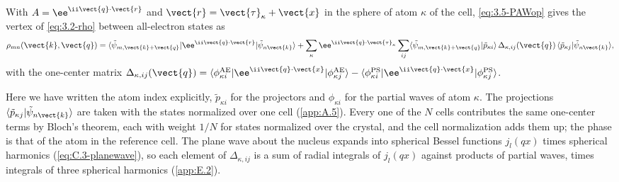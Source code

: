 \begin{keyresult}
With $A = \ee^{\ii\vect{q}\cdot\vect{r}}$ and $\vect{r} = \vect{\tau}_\kappa + \vect{x}$ in the sphere of atom $\kappa$ of the cell, \cref{eq:3.5-PAWop} gives the vertex of \cref{eq:3.2-rho} between all-electron states as
\begin{equation}
  \rho_{mn}(\vect{k}, \vect{q}) = \langle\tilde\psi_{m,\vect{k}+\vect{q}}|\ee^{\ii\vect{q}\cdot\vect{r}}|\tilde\psi_{n\vect{k}}\rangle
  + \sum_\kappa\ee^{\ii\vect{q}\cdot\vect{\tau}_\kappa}\sum_{ij}\langle\tilde\psi_{m,\vect{k}+\vect{q}}|\tilde p_{\kappa i}\rangle\,\Delta_{\kappa,ij}(\vect{q})\,\langle\tilde p_{\kappa j}|\tilde\psi_{n\vect{k}}\rangle ,
  \label{eq:3.5-rhoAE}
\end{equation}
with the one-center matrix $\Delta_{\kappa,ij}(\vect{q}) = \langle\phi^{\mathrm{AE}}_{\kappa i}|\ee^{\ii\vect{q}\cdot\vect{x}}|\phi^{\mathrm{AE}}_{\kappa j}\rangle - \langle\phi^{\mathrm{PS}}_{\kappa i}|\ee^{\ii\vect{q}\cdot\vect{x}}|\phi^{\mathrm{PS}}_{\kappa j}\rangle$.
\end{keyresult}
Here we have written the atom index explicitly, $\tilde p_{\kappa i}$ for the projectors and $\phi_{\kappa i}$ for the partial waves of atom $\kappa$. The projections $\langle\tilde p_{\kappa j}|\tilde\psi_{n\vect{k}}\rangle$ are taken with the states normalized over one cell (\cref{app:A.5}). Every one of the $N$ cells contributes the same one-center terms by Bloch's theorem, each with weight $1/N$ for states normalized over the crystal, and the cell normalization adds them up; the phase is that of the atom in the reference cell. The plane wave about the nucleus expands into spherical Bessel functions $j_l(qx)$ times spherical harmonics (\cref{eq:C.3-planewave}), so each element of $\Delta_{\kappa,ij}$ is a sum of radial integrals of $j_l(qx)$ against products of partial waves, times integrals of three spherical harmonics (\cref{app:E.2}).

